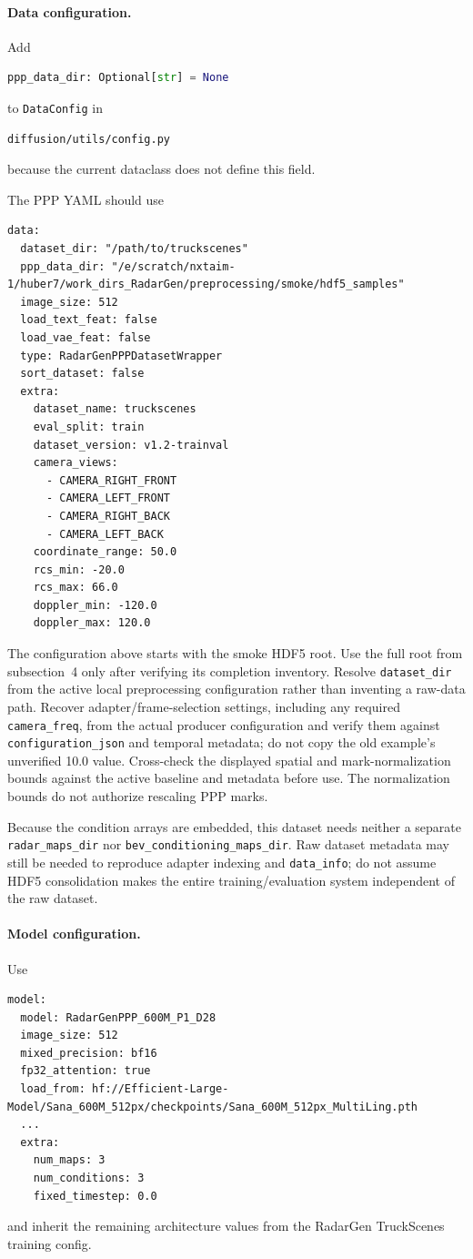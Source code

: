 \documentclass[11pt,a4paper]{article}
\begin{document}
\paragraph{Data configuration.}
Add
\begin{lstlisting}[language=Python]
ppp_data_dir: Optional[str] = None
\end{lstlisting}
to \texttt{DataConfig} in
\begin{lstlisting}
diffusion/utils/config.py
\end{lstlisting}
because the current dataclass does not define this field.

The PPP YAML should use
\begin{lstlisting}
data:
  dataset_dir: "/path/to/truckscenes"
  ppp_data_dir: "/e/scratch/nxtaim-1/huber7/work_dirs_RadarGen/preprocessing/smoke/hdf5_samples"
  image_size: 512
  load_text_feat: false
  load_vae_feat: false
  type: RadarGenPPPDatasetWrapper
  sort_dataset: false
  extra:
    dataset_name: truckscenes
    eval_split: train
    dataset_version: v1.2-trainval
    camera_views:
      - CAMERA_RIGHT_FRONT
      - CAMERA_LEFT_FRONT
      - CAMERA_RIGHT_BACK
      - CAMERA_LEFT_BACK
    coordinate_range: 50.0
    rcs_min: -20.0
    rcs_max: 66.0
    doppler_min: -120.0
    doppler_max: 120.0
\end{lstlisting}

The configuration above starts with the smoke HDF5 root. Use the full root from subsection~4 only after verifying its completion inventory. Resolve \texttt{dataset\_dir} from the active local preprocessing configuration rather than inventing a raw-data path. Recover adapter/frame-selection settings, including any required \texttt{camera\_freq}, from the actual producer configuration and verify them against \texttt{configuration\_json} and temporal metadata; do not copy the old example's unverified 10.0 value. Cross-check the displayed spatial and mark-normalization bounds against the active baseline and metadata before use. The normalization bounds do not authorize rescaling PPP marks.

Because the condition arrays are embedded, this dataset needs neither a separate \texttt{radar\_maps\_dir} nor \texttt{bev\_conditioning\_maps\_dir}. Raw dataset metadata may still be needed to reproduce adapter indexing and \texttt{data\_info}; do not assume HDF5 consolidation makes the entire training/evaluation system independent of the raw dataset.

\paragraph{Model configuration.}
Use
\begin{lstlisting}
model:
  model: RadarGenPPP_600M_P1_D28
  image_size: 512
  mixed_precision: bf16
  fp32_attention: true
  load_from: hf://Efficient-Large-Model/Sana_600M_512px/checkpoints/Sana_600M_512px_MultiLing.pth
  ...
  extra:
    num_maps: 3
    num_conditions: 3
    fixed_timestep: 0.0
\end{lstlisting}
and inherit the remaining architecture values from the RadarGen TruckScenes training config.
\end{document}
